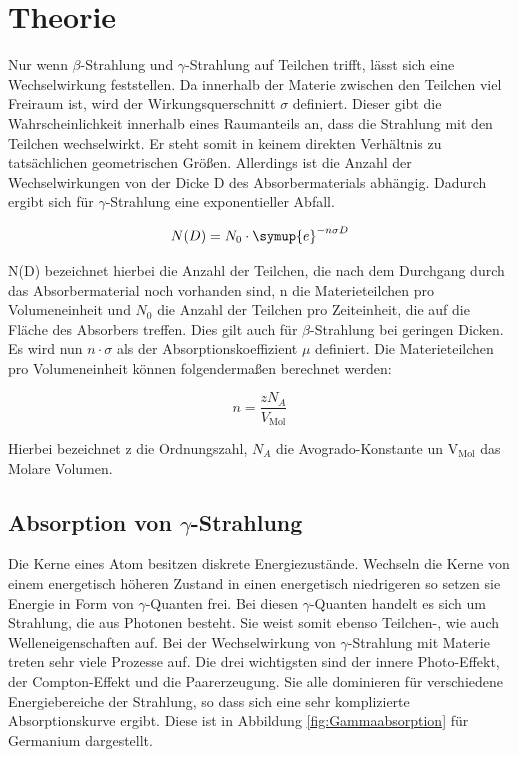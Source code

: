 \section{Theorie}
\label{sec:Theorie}

Nur wenn $\beta$-Strahlung und $\gamma$-Strahlung auf Teilchen trifft, lässt sich eine Wechselwirkung feststellen.
Da innerhalb der Materie zwischen den Teilchen viel Freiraum ist, wird der Wirkungsquerschnitt $\sigma$ definiert.
Dieser gibt die Wahrscheinlichkeit innerhalb eines Raumanteils an, dass die Strahlung mit den Teilchen wechselwirkt.
Er steht somit in keinem direkten Verhältnis zu tatsächlichen geometrischen Größen.
Allerdings ist die Anzahl der Wechselwirkungen von der Dicke D des Absorbermaterials abhängig.
Dadurch ergibt sich für $\gamma$-Strahlung eine exponentieller Abfall.

\begin{equation}
  N(D) = N_0 \cdot \symup{e}^{-n \sigma D}
  \label{eqn:expo}
\end{equation}

N(D) bezeichnet hierbei die Anzahl der Teilchen, die nach dem Durchgang durch das Absorbermaterial noch vorhanden sind, n die Materieteilchen pro Volumeneinheit und $N_0$ die Anzahl der Teilchen pro Zeiteinheit, die auf die Fläche des Absorbers treffen.
Dies gilt auch für $\beta$-Strahlung bei geringen Dicken.
Es wird nun $n \cdot \sigma$ als der Absorptionskoeffizient $\mu$ definiert.
Die Materieteilchen pro Volumeneinheit können folgendermaßen berechnet werden:

\begin{equation}
  n = \frac{z N_A}{V_\text{Mol}}
  \label{eqn:n}
\end{equation}

Hierbei bezeichnet z die Ordnungszahl, $N_A$ die Avogrado-Konstante un V$_\text{Mol}$ das Molare Volumen.

\subsection{Absorption von \texorpdfstring{$\gamma$}{Gamma}-Strahlung}

Die Kerne eines Atom besitzen diskrete Energiezustände.
Wechseln die Kerne von einem energetisch höheren Zustand in einen energetisch niedrigeren so setzen sie Energie in Form von $\gamma$-Quanten frei.
Bei diesen $\gamma$-Quanten handelt es sich um Strahlung, die aus Photonen besteht.
Sie weist somit ebenso Teilchen-, wie auch Welleneigenschaften auf.
Bei der Wechselwirkung von $\gamma$-Strahlung mit Materie treten sehr viele Prozesse auf.
Die drei wichtigsten sind der innere Photo-Effekt, der Compton-Effekt und die Paarerzeugung.
Sie alle dominieren für verschiedene Energiebereiche der Strahlung, so dass sich eine sehr komplizierte Absorptionskurve ergibt.
Diese ist in Abbildung \ref{fig:Gammaabsorption} für Germanium dargestellt.

